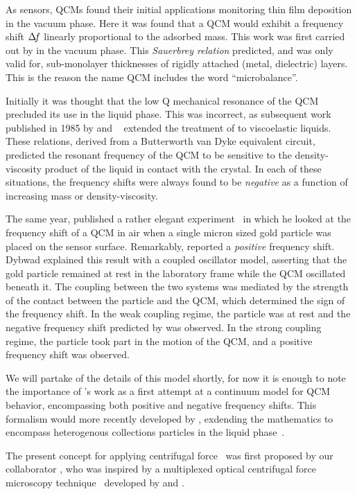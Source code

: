 As sensors, QCMs found their initial applications monitoring thin film
deposition in the vacuum phase.  Here it was found that a QCM would exhibit
a frequency shift $\Delta\!f$ linearly proportional to the adsorbed mass.  This
work was first carried out by  in the vacuum phase.  This
\textit{Sauerbrey relation} predicted, and was only valid for,
sub-monolayer thicknesses of rigidly attached (metal, dielectric) layers.
This is the reason the name QCM includes the word ``microbalance''.

Initially it was thought that the low Q mechanical resonance of the QCM
precluded its use in the liquid phase.  This was incorrect, as subsequent
work published in 1985 by  and
~\cite{kanazawa1985frequency} extended the treatment of
 to viscoelastic liquids.  These relations, derived from a
Butterworth van Dyke equivalent circuit, predicted the resonant frequency
of the QCM to be sensitive to the density-viscosity product of the liquid
in contact with the crystal.  In each of these situations, the frequency
shifts were always found to be \textit{negative} as a function of
increasing mass or density-viscosity.

The same year,  published a rather elegant
experiment~\cite{dybwad1985sensitive} in which he looked at the frequency
shift of a QCM in air when a single micron sized gold particle was placed
on the sensor surface.  Remarkably,  reported a
\textit{positive} frequency shift.  Dybwad explained this result with a
coupled oscillator model, asserting that the gold particle remained at rest
in the laboratory frame while the QCM oscillated beneath it.  The coupling
between the two systems was mediated by the strength of the contact between
the particle and the QCM, which determined the sign of the frequency shift.
In the weak coupling regime, the particle was at rest and the negative
frequency shift predicted by  was observed.  In the strong
coupling regime, the particle took part in the motion of the QCM, and a
positive frequency shift was observed.

We will partake of the details of this model shortly, for now it is enough
to note the importance of 's work as a first attempt at a
continuum model for QCM behavior, encompassing both positive and negative
frequency shifts.  This formalism would more recently developed by
, exdending the mathematics to encompass heterogenous
collections particles in the liquid phase~\cite{johannsman2007contacts}.

The present concept for applying centrifugal force~\cite{webster2013qcm}
was first proposed by our collaborator , who was inspired by a
multiplexed optical centrifugal force microscopy
technique~\cite{halvorsen2010massively} developed by  and
.  
